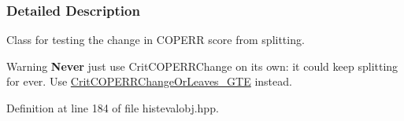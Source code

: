 \subsubsection{\-Detailed \-Description}
\-Class for testing the change in \-C\-O\-P\-E\-R\-R score from splitting. 

\begin{DoxyWarning}{\-Warning}
{\bfseries \-Never} just use \-Crit\-C\-O\-P\-E\-R\-R\-Change on its own\-: it could keep splitting for ever. \-Use \hyperlink{classsubpavings_1_1CritCOPERRChangeOrLeaves__GTE}{\-Crit\-C\-O\-P\-E\-R\-R\-Change\-Or\-Leaves\-\_\-\-G\-T\-E} instead. 
\end{DoxyWarning}


\-Definition at line 184 of file histevalobj.\-hpp.



